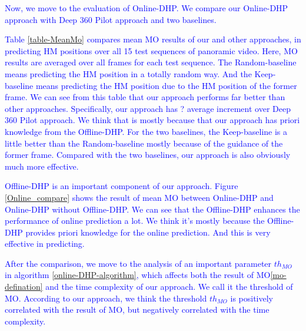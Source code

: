 \documentclass[10pt,journal,compsoc]{IEEEtran}
\begin{document}
\textcolor{blue}{Now, we move to the evaluation of Online-DHP. We compare our Online-DHP approach with Deep 360 Pilot approach\cite{hu2017deep} and two baselines.}

\textcolor{blue}{Table \ref{table-MeanMo} compares mean MO results of our and other approaches, in predicting HM positions over all 15 test sequences of panoramic video.
Here, MO results are averaged over all frames for each test sequence.
The Random-baseline means predicting the HM position in a totally random way.
And the Keep-baseline means predicting the HM position due to the HM position of the former frame.
We can see from this table that our approach performs far better than other approaches. Specifically, our approach has ? average increment over Deep 360 Pilot approach\cite{hu2017deep}.
We think that is mostly because that our approach has priori knowledge from the Offline-DHP.
For the two baselines, the Keep-baseline is a little better than the Random-baseline mostly because of the guidance of the former frame.
Compared with the two baselines, our approach is also obviously much more effective.}

\textcolor{blue}{Offline-DHP is an important component of our approach.
Figure \ref{Online_compare} shows the result of mean MO between Online-DHP and Online-DHP without Offline-DHP.
We can see that the Offline-DHP enhances the performance of online prediction a lot.
We think it's mostly because the Offline-DHP provides priori knowledge for the online prediction.
And this is very effective in predicting.}

\textcolor{blue}{After the comparison, we move to the analysis of an important parameter $th_{MO}$ in algorithm \ref{online-DHP-algorithm}, which affects both the result of MO\eqref{mo-defination} and the time complexity of our approach.
We call it the threshold of MO.
According to our approach, we think the threshold $th_{MO}$ is positively correlated with the result of MO, but negatively correlated with the time complexity.}
\end{document}
